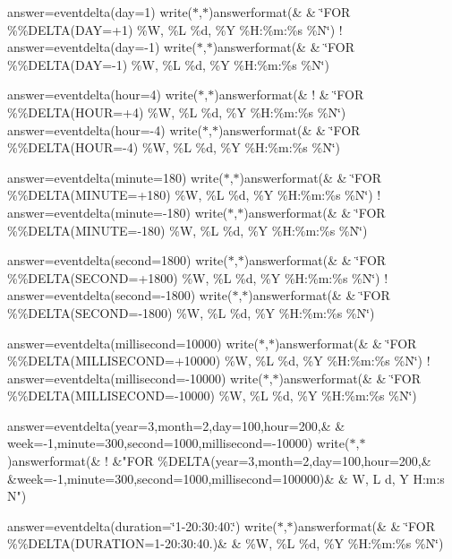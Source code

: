 answer=eventdelta(day=1) write($\ast$,$\ast$)answerformat(\& \& \char`\"{}\+F\+O\+R \%\%\+D\+E\+L\+T\+A(\+D\+A\+Y=+1)             \%\+W, \%\+L \%d, \%\+Y \%\+H\+:\%m\+:\%s \%\+N\char`\"{}) ! answer=eventdelta(day=-\/1) write($\ast$,$\ast$)answerformat(\& \& \char`\"{}\+F\+O\+R \%\%\+D\+E\+L\+T\+A(\+D\+A\+Y=-\/1)             \%\+W, \%\+L \%d, \%\+Y \%\+H\+:\%m\+:\%s \%\+N\char`\"{})

answer=eventdelta(hour=4) write($\ast$,$\ast$)answerformat(\& ! \& \char`\"{}\+F\+O\+R \%\%\+D\+E\+L\+T\+A(\+H\+O\+U\+R=+4)            \%\+W, \%\+L \%d, \%\+Y \%\+H\+:\%m\+:\%s \%\+N\char`\"{}) answer=eventdelta(hour=-\/4) write($\ast$,$\ast$)answerformat(\& \& \char`\"{}\+F\+O\+R \%\%\+D\+E\+L\+T\+A(\+H\+O\+U\+R=-\/4)            \%\+W, \%\+L \%d, \%\+Y \%\+H\+:\%m\+:\%s \%\+N\char`\"{})

answer=eventdelta(minute=180) write($\ast$,$\ast$)answerformat(\& \& \char`\"{}\+F\+O\+R \%\%\+D\+E\+L\+T\+A(\+M\+I\+N\+U\+T\+E=+180)        \%\+W, \%\+L \%d, \%\+Y \%\+H\+:\%m\+:\%s \%\+N\char`\"{}) ! answer=eventdelta(minute=-\/180) write($\ast$,$\ast$)answerformat(\& \& \char`\"{}\+F\+O\+R \%\%\+D\+E\+L\+T\+A(\+M\+I\+N\+U\+T\+E=-\/180)        \%\+W, \%\+L \%d, \%\+Y \%\+H\+:\%m\+:\%s \%\+N\char`\"{})

answer=eventdelta(second=1800) write($\ast$,$\ast$)answerformat(\& \& \char`\"{}\+F\+O\+R \%\%\+D\+E\+L\+T\+A(\+S\+E\+C\+O\+N\+D=+1800)       \%\+W, \%\+L \%d, \%\+Y \%\+H\+:\%m\+:\%s \%\+N\char`\"{}) ! answer=eventdelta(second=-\/1800) write($\ast$,$\ast$)answerformat(\& \& \char`\"{}\+F\+O\+R \%\%\+D\+E\+L\+T\+A(\+S\+E\+C\+O\+N\+D=-\/1800)       \%\+W, \%\+L \%d, \%\+Y \%\+H\+:\%m\+:\%s \%\+N\char`\"{})

answer=eventdelta(millisecond=10000) write($\ast$,$\ast$)answerformat(\& \& \char`\"{}\+F\+O\+R \%\%\+D\+E\+L\+T\+A(\+M\+I\+L\+L\+I\+S\+E\+C\+O\+N\+D=+10000) \%\+W, \%\+L \%d, \%\+Y \%\+H\+:\%m\+:\%s \%\+N\char`\"{}) ! answer=eventdelta(millisecond=-\/10000) write($\ast$,$\ast$)answerformat(\& \& \char`\"{}\+F\+O\+R \%\%\+D\+E\+L\+T\+A(\+M\+I\+L\+L\+I\+S\+E\+C\+O\+N\+D=-\/10000) \%\+W, \%\+L \%d, \%\+Y \%\+H\+:\%m\+:\%s \%\+N\char`\"{})

answer=eventdelta(year=3,month=2,day=100,hour=200,\& \& week=-\/1,minute=300,second=1000,millisecond=-\/10000) write($\ast$,$\ast$)answerformat(\& ! \&"F\+OR \%D\+E\+L\+TA(year=3,month=2,day=100,hour=200,\& \&week=-\/1,minute=300,second=1000,millisecond=100000)\& \& W, L d, Y H\+:m\+:s N")

answer=eventdelta(duration=\char`\"{}1-\/20\+:30\+:40.\char`\"{}) write($\ast$,$\ast$)answerformat(\& \& \char`\"{}\+F\+O\+R \%\%\+D\+E\+L\+T\+A(\+D\+U\+R\+A\+T\+I\+O\+N=\textquotesingle{}1-\/20\+:30\+:40.\textquotesingle{})\&
        \& \%\+W, \%\+L \%d, \%\+Y \%\+H\+:\%m\+:\%s \%\+N\char`\"{})

